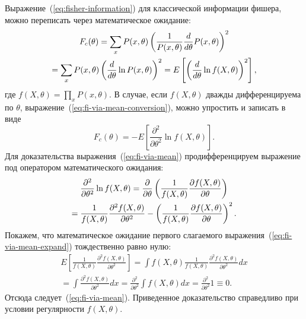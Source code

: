 Выражение~(\ref{eq:fisher-information}) для классической информации фишера, можно переписать через математическое ожидание:
\begin{multline}\label{eq:fi-via-mean-conversion}
    F_c(\theta)
    = \sum_x P(x, \theta)\left( \frac{1}{P(x,\theta)}\frac{d}{d \theta} P(x, \theta) \right)^2 \\
    = \sum_x P(x,\theta)\left( \frac{d}{d \theta} \ln P(x, \theta) \right)^2
    = E\left[\left( \frac{d}{d \theta}\ln f(X,\theta) \right)^2 \right],
\end{multline}
%
где $f(X,\theta) = \prod_x P(x, \theta)$.
В случае, если $f(X,\theta)$ дважды дифференцируема по $\theta$,
выражение~(\ref{eq:fi-via-mean-conversion}), можно упростить и записать в виде
%
\begin{equation}\label{eq:fi-via-mean}
  F_c(\theta) = -E \left[\frac{\partial^2}{\partial \theta^2} \ln f(X,\theta)\right].
\end{equation}
%
Для доказательства выражения~(\ref{eq:fi-via-mean})
продифференцируем выражение под оператором математического ожидания:
%
\begin{multline}\label{eq:fi-via-mean-expand}
  \frac{\partial^2}{\partial \theta^2}\ln f(X,\theta) 
  = \frac{\partial}{\partial \theta}\left( \frac{1}{f(X,\theta)}
    \frac{\partial f(X,\theta)}{\partial \theta}  \right) \\
  = \frac{1}{f(X,\theta)}\frac{\partial^2 f(X,\theta)}{\partial \theta^2} 
  - \left( \frac{1}{f(X,\theta)} \frac{\partial f(X,\theta)}{\partial \theta} \right)^2.
\end{multline}
%
Покажем,
что математическое ожидание первого слагаемого выражения~(\ref{eq:fi-via-mean-expand}) тождественно равно нулю:
%
\begin{multline}\label{eq:fi-via-mean-proof}
  E\left[\frac{1}{f(X,\theta)}
    \frac{\partial^2 f(X,\theta)}{\partial \theta^2}\right] 
  = \int f (X,\theta) \frac{1}{f(X,\theta)}
    \frac{\partial^2 f(X, \theta)}{\partial \theta^2}dx \\
  = \int \frac{\partial^2 f(X,\theta)}{\partial \theta^2}dx 
  = \frac{\partial^2}{\partial \theta^2} \int f(X,\theta)dx
  = \frac{\partial^2}{\partial \theta^2}1 
  \equiv 0.
\end{multline}
%
Отсюда следует~(\ref{eq:fi-via-mean}).
Приведенное доказательство справедливо при условии регулярности $f(X,\theta)$.


